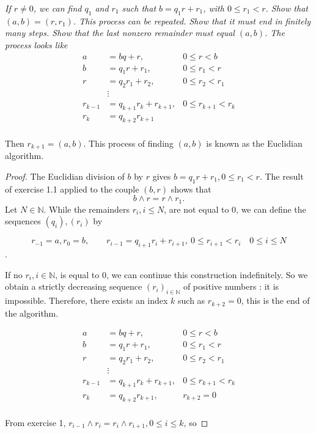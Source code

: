 \documentclass[11pt,a4paper]{article}
\begin{document}
{\it If $r\neq 0$, we can find $q_1$ and $r_1$ such that $b = q_1r+r_1$, with $0 \leq r_1 < r$. Show that $(a,b) = (r,r_1)$. This process can be repeated. Show that it must end in finitely many steps. Show that the last nonzero remainder must equal $(a,b)$. The process looks like
\begin{align*}
a &= b q + r,  &0 \leq r <b\\
b &= q_1 r + r_1, &0 \leq r_1 <r\\
r &= q_2 r_1 + r_2,  &0\leq r_2 <r_1\\
&\vdots\\
r_{k-1} &= q_{k+1} r_k + r_{k+1}, &0 \leq r_{k+1} <r_k\\
r_k &= q_{k+2} r_{k+1}\\
\end{align*}

Then $r_{k+1} = (a,b)$. This process of finding $(a,b)$ is known as the Euclidian algorithm.

\begin{proof}
The Euclidian division of $b$ by $r$ gives $b = q_1 r + r_1, 0\leq r_1 < r$. The result of exercise 1.1 applied to the couple $(b,r)$ shows that
$$b \wedge r = r \wedge r_1.$$
Let $N \in \mathbb{N}$. While the remainders $r_i, i \leq N$, are not equal to 0, we can define the sequences $(q_i), (r_i)$ by

$$r_{-1} = a, r_0 = b, \qquad r_{i-1} = q_{i+1} r_i  + r_{i+1},\  0\leq r_{i+1} < r_i \quad  0\leq i \leq N$$.

If no  $r_i, i\in \mathbb{N}$, is equal to 0, we can continue this construction indefinitely. So we obtain a strictly decreasing sequence $(r_i)_{i \in \mathbb{N}}$ of positive numbers : it is impossible. Therefore, there exists an index $k$ such as $r_{k+2} = 0$, this is the end of the algorithm.

\begin{align*}
a &= b q + r,  &0 \leq r <b\\
b &= q_1 r + r_1, &0 \leq r_1 <r\\
r &= q_2 r_1 + r_2,  &0\leq r_2 <r_1\\
&\vdots\\
r_{k-1} &= q_{k+1} r_k + r_{k+1}, &0 \leq r_{k+1} <r_k\\
r_k &= q_{k+2} r_{k+1}, &r_{k+2} = 0\\
\end{align*}

From exercise 1,  $r_{i-1} \wedge r_{i} = r_{i} \wedge r_{i+1}, 0 \leq i \leq k$,  so


\end{proof}}
\end{document}
